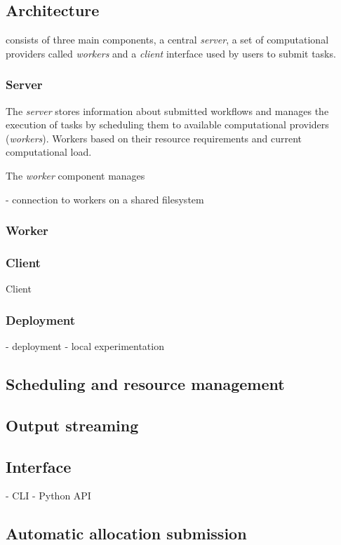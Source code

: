 \subsection{Architecture}
\hyperqueue{} consists of three main components, a central \emph{server}, a set of computational providers called
\emph{workers} and a \emph{client} interface used by users to submit tasks.

\subsubsection*{Server}
The \emph{server} stores information about submitted workflows and manages the execution of tasks by scheduling them to available computational providers (\emph{workers}).
Workers based on their resource requirements and current computational load.

The \emph{worker} component manages

- connection to workers on a shared filesystem

\subsubsection*{Worker}

\subsubsection*{Client}
Client

\subsubsection*{Deployment}
- deployment
- local experimentation

\subsection{Scheduling and resource management}

\subsection{Output streaming}

\subsection{Interface}
- CLI
- Python API

\subsection{Automatic allocation submission}

